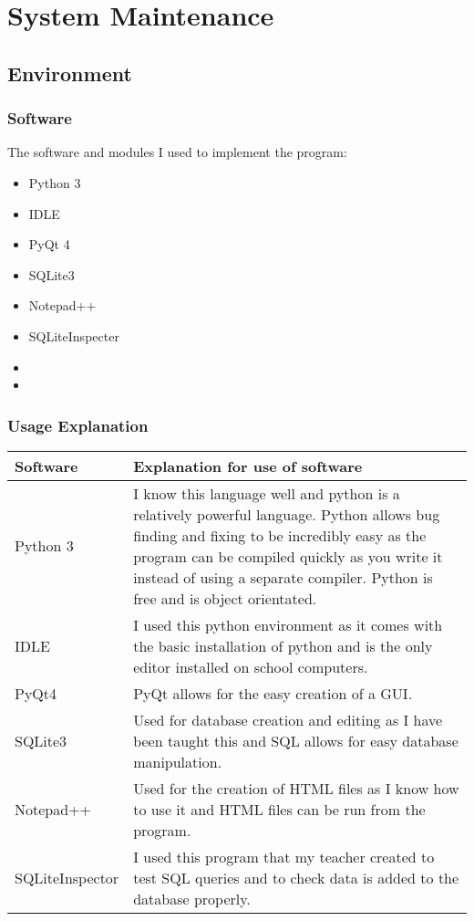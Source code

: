 \chapter{System Maintenance}

\section{Environment}

\subsection{Software}
The software and modules I used to implement the program:
\begin{itemize}
	\item Python 3
	\item IDLE
	\item PyQt 4
	\item SQLite3
	\item Notepad++
	\item SQLiteInspecter
	\item 
	\item 
\end{itemize}

\subsection{Usage Explanation}
\begin{center}
	\begin{tabular}{|p{2cm}|p{2cm}|}
		\hline
		\textbf{Software}   & \textbf{Explanation for use of software} \\ \hline
		Python 3 & I know this language well and python is a relatively powerful language. Python allows bug finding and fixing to be incredibly easy as the program can be compiled quickly as you write it instead of using a separate compiler. Python is free and is object orientated. \\ \hline
		IDLE &  I used this python environment as it comes with the basic installation of python and is the only editor installed on school computers. \\ \hline
		PyQt4 & PyQt allows for the easy creation of a GUI. \\ \hline
		SQLite3 & Used for database creation and editing as I have been taught this and SQL allows for easy database manipulation. \\ \hline
		Notepad++ & Used for the creation of HTML files as I know how to use it and HTML files can be run from the program. \\ \hline
		SQLiteInspector & I used this program that my teacher created to test SQL queries and to check data is added to the database properly. \\ \hline
	\end{tabular}
\end{center}


